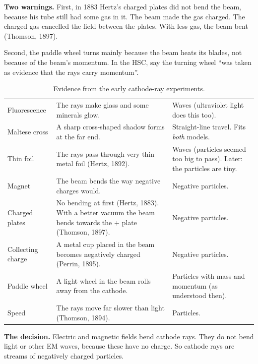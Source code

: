 \textbf{Two warnings.} First, in 1883 Hertz's charged plates did not bend the
beam, because his tube still had some gas in it. The beam made the gas charged.
The charged gas cancelled the field between the plates. With less gas, the beam
bent (Thomson, 1897).

Second, the paddle wheel turns mainly because the beam heats its blades, not
because of the beam's momentum. In the HSC, say the turning wheel ``was taken as
evidence that the rays carry momentum''.

\begin{table}
  \caption{Evidence from the early cathode-ray experiments.}\label{ch2:tab:evidence}
  \centering\small
  \begin{tabular}{@{}L{25mm}L{66mm}L{50mm}@{}}
    \toprule
     &  & \\
    \midrule
    Fluorescence & The rays make glass and some minerals glow. &
      Waves (ultraviolet light does this too).\\
    Maltese cross & A sharp cross-shaped shadow forms at the far end. &
      Straight-line travel. Fits \emph{both} models.\\
    Thin foil & The rays pass through very thin metal foil (Hertz, 1892). &
      Waves (particles seemed too big to pass). Later: the particles are tiny.\\
    Magnet & The beam bends the way negative charges would. & Negative particles.\\
    Charged plates & No bending at first (Hertz, 1883). With a better vacuum
      the beam bends towards the $+$ plate (Thomson, 1897). & Negative particles.\\
    Collecting charge & A metal cup placed in the beam becomes negatively
      charged (Perrin, 1895). & Negative particles.\\
    Paddle wheel & A light wheel in the beam rolls away from the cathode. &
      Particles with mass and momentum (as understood then).\\
    Speed & The rays move far slower than light (Thomson, 1894). & Particles.\\
    \bottomrule
  \end{tabular}
\end{table}

\textbf{The decision.} Electric and magnetic fields bend cathode rays. They do
not bend light or other EM waves, because these have no charge. So cathode rays
are streams of negatively charged particles.

